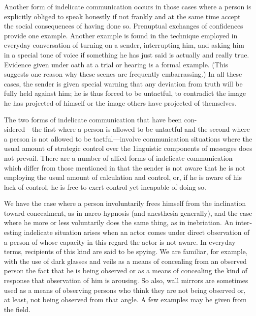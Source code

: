 \documentclass[openany,nobib]{tufte-book}
\begin{document}
Another form of indelicate communication occurs in those cases where a
person is explicitly obliged to speak honestly if not frankly and at the
same time accept the social consequences of having done so. Prenuptual
exchanges of confidences provide one example. Another example is found
in the technique employed in everyday conversation of turning on a
sender, interrupting him, and asking him in a special tone of voice if
something he has just said is actually and really true. Evidence given
under oath at a trial or hearing is a formal example. (This suggests one
reason why these scenes are frequently embarrassing.) In all these
cases, the sender is given special warning that any deviation from truth
will be fully held against him; he is thus forced to be untactful, to
contradict the image he has projected of himself or the image others
have projected of themselves.

The two forms of indelicate communication that have been
con-\\\noindent sidered---the first where a person is allowed to be untactful and the
second where a person is not allowed to be tactful---in­volve
communication situations where the usual amount of stra­tegic control
over the 1inguistic components of messages does not prevail. There are a
number of allied forms of indelicate communication which differ from
those mentioned in that the sender is not aware that he is not employing
the usual amount of calculation and control, or, if he is aware of his
lack of con­trol, he is free to exert control yet incapable of doing so.

We have the case where a person involuntarily frees him­self from the
inclination toward concealment, as in narco-hypnosis (and anesthesia
generally), and the case where he more or less voluntarily does the same
thing, as in inebriation. An inter­esting indelicate situation arises
when an actor comes under direct observation of a person of whose
capacity in this regard the actor is not aware. In everyday terms,
recipients of this kind are said to be spying. We are familiar, for
example, with the use of dark glasses and veils as a means of concealing
from an observed person the fact that he is being observed or as a means
of concealing the kind of response that observation of him is arousing.
So also, wall mirrors are sometimes used as a means of observing persons
who think they are not being observed or, at least, not being observed
from that angle. A few examples may be given from the field.
\end{document}
